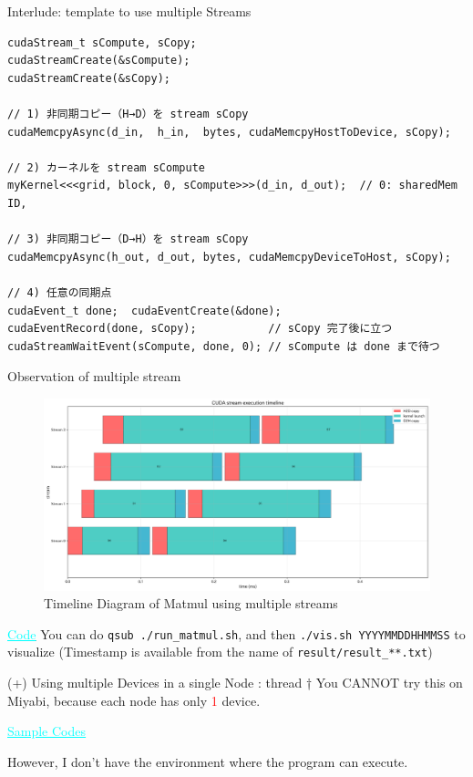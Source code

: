 \documentclass[dvipdfmx, 11pt, aspectratio=169]{beamer}   %
\newcommand{\ulhref}[2]{\href{#1}{\textcolor{cyan}{\uline{#2}}}}
\begin{document}
\begin{frame}[fragile]{Interlude: template to use multiple Streams}
  \begin{lstlisting}[language=CUDA]
cudaStream_t sCompute, sCopy;
cudaStreamCreate(&sCompute);
cudaStreamCreate(&sCopy);

// 1) 非同期コピー（H→D）を stream sCopy
cudaMemcpyAsync(d_in,  h_in,  bytes, cudaMemcpyHostToDevice, sCopy);

// 2) カーネルを stream sCompute
myKernel<<<grid, block, 0, sCompute>>>(d_in, d_out);  // 0: sharedMem ID, 

// 3) 非同期コピー（D→H）を stream sCopy
cudaMemcpyAsync(h_out, d_out, bytes, cudaMemcpyDeviceToHost, sCopy);

// 4) 任意の同期点
cudaEvent_t done;  cudaEventCreate(&done);
cudaEventRecord(done, sCopy);           // sCopy 完了後に立つ
cudaStreamWaitEvent(sCompute, done, 0); // sCompute は done まで待つ
\end{lstlisting}
\end{frame}
\begin{frame}[fragile]{Observation of multiple stream}
\begin{figure}
  \includegraphics[scale=0.25]{img/resultMatmulMultistream20250703142638TimelineDiagram.png}
  \caption{Timeline Diagram of Matmul using multiple streams}
\end{figure}
\vspace{-\baselineskip}

\ulhref{https://github.com/gunnersgoestocl/cuda-introduction/blob/main/multistream/}{Code}  
{\small
  You can do \lstinline|qsub ./run_matmul.sh|, and then \lstinline|./vis.sh YYYYMMDDHHMMSS| to visualize (Timestamp is available from the name of  \lstinline|result/result_**.txt|)}
\end{frame}
\begin{frame}{(+) Using multiple Devices in a single Node : thread}
  † You CANNOT try this on Miyabi, because each node has only \textcolor{red}{1} device.

  \ulhref{https://github.com/gunnersgoestocl/cuda-introduction/blob/main/multinode/matmul_multidevice.cu}{Sample Codes}

  However, I don't have the environment where the program can execute.
\end{frame}
\end{document}
